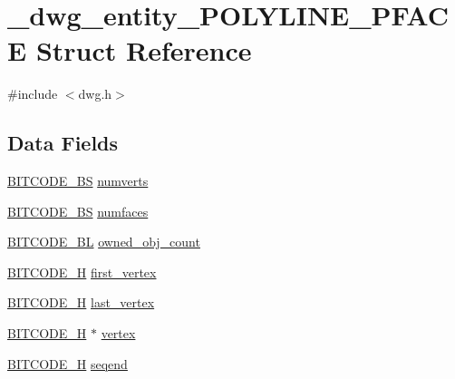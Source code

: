 \hypertarget{struct__dwg__entity__POLYLINE__PFACE}{\section{\-\_\-dwg\-\_\-entity\-\_\-\-P\-O\-L\-Y\-L\-I\-N\-E\-\_\-\-P\-F\-A\-C\-E \-Struct \-Reference}
\label{struct__dwg__entity__POLYLINE__PFACE}
}


{\ttfamily \#include $<$dwg.\-h$>$}

\subsection*{\-Data \-Fields}
\begin{DoxyCompactItemize}
\item 
\hyperlink{dwg_8h_a94297606fbd4a4ff97e8add284af0809}{\-B\-I\-T\-C\-O\-D\-E\-\_\-\-B\-S} \hyperlink{struct__dwg__entity__POLYLINE__PFACE_a67bda1266c973a4600fbd32c4375b6a9}{numverts}
\item 
\hyperlink{dwg_8h_a94297606fbd4a4ff97e8add284af0809}{\-B\-I\-T\-C\-O\-D\-E\-\_\-\-B\-S} \hyperlink{struct__dwg__entity__POLYLINE__PFACE_a3cf23cf4fd7ecaa908f16406ba921c18}{numfaces}
\item 
\hyperlink{dwg_8h_aebd5f127038868cbabc3d55d91da776c}{\-B\-I\-T\-C\-O\-D\-E\-\_\-\-B\-L} \hyperlink{struct__dwg__entity__POLYLINE__PFACE_a707b4ff8e569479f21a5248ff9ef27f0}{owned\-\_\-obj\-\_\-count}
\item 
\hyperlink{dwg_8h_a7c700e94e047a97ba8c24bdfe4029dc3}{\-B\-I\-T\-C\-O\-D\-E\-\_\-\-H} \hyperlink{struct__dwg__entity__POLYLINE__PFACE_aa778df9ed0b1104a5b667b5541ec0acb}{first\-\_\-vertex}
\item 
\hyperlink{dwg_8h_a7c700e94e047a97ba8c24bdfe4029dc3}{\-B\-I\-T\-C\-O\-D\-E\-\_\-\-H} \hyperlink{struct__dwg__entity__POLYLINE__PFACE_ac0bf50fd6e590b992903fc5ddd39746d}{last\-\_\-vertex}
\item 
\hyperlink{dwg_8h_a7c700e94e047a97ba8c24bdfe4029dc3}{\-B\-I\-T\-C\-O\-D\-E\-\_\-\-H} $\ast$ \hyperlink{struct__dwg__entity__POLYLINE__PFACE_a3569d10bd03207d404091066ae059dbd}{vertex}
\item 
\hyperlink{dwg_8h_a7c700e94e047a97ba8c24bdfe4029dc3}{\-B\-I\-T\-C\-O\-D\-E\-\_\-\-H} \hyperlink{struct__dwg__entity__POLYLINE__PFACE_a1132153bb12b43daf63d4fe362521453}{seqend}
\end{DoxyCompactItemize}


